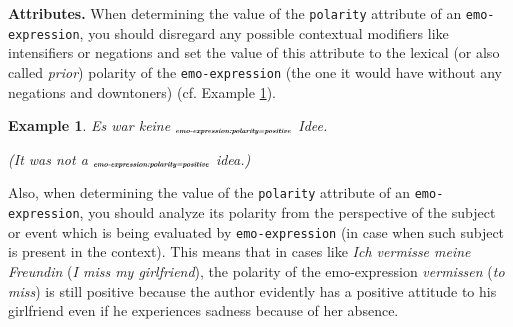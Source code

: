 \documentclass[11pt,a4paper]{article}
\theoremstyle{mytheoremstyle}
\newtheorem{exmp}{Example}[section]
\newcommand{\mtag}[2]{{\upshape[\emph{#2}\upshape]$_{\textrm{\bfseries\emph{\tiny
        #1}}}$}}
\newcommand{\emoexpression}[2][]{\mtag{emo-\-ex\-pression\ifstrempty{#1}{}{:#1}}{#2}}
\begin{document}
\noindent\textbf{Attributes.} When determining the value of the
\texttt{polarity} attribute of an \texttt{emo-expression}, you should
disregard any possible contextual modifiers like intensifiers or negations and
set the value of this attribute to the lexical (or also called \emph{prior})
polarity of the \texttt{emo-expression} (the one it would have without any
negations and downtoners) (cf. Example \ref{exmp:emo-expression-polarity}).
\begin{exmp}
Es war keine \emoexpression[polarity=positive]{gute} Idee.

(It was not a \emoexpression[polarity=positive]{good} idea.)\label{exmp:emo-expression-polarity}
\end{exmp}

Also, when determining the value of the \texttt{polarity} attribute of an
\texttt{emo-expression}, you should analyze its polarity from the perspective
of the subject or event which is being evaluated by \texttt{emo-expression}
(in case when such subject is present in the context).  This means that in
cases like \textit{Ich vermisse meine Freundin} (\textit{I miss my
  girlfriend}), the polarity of the emo-expression \textit{vermissen}
(\textit{to miss}) is still positive because the author evidently has a
positive attitude to his girlfriend even if he experiences sadness because of
her absence.
\end{document}

